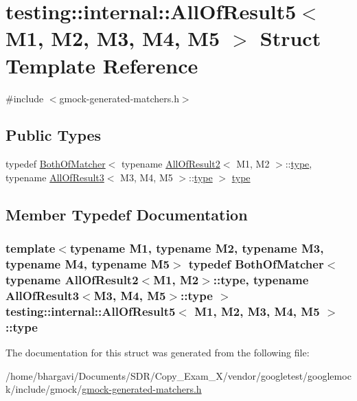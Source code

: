 \hypertarget{structtesting_1_1internal_1_1_all_of_result5}{}\section{testing\+:\+:internal\+:\+:All\+Of\+Result5$<$ M1, M2, M3, M4, M5 $>$ Struct Template Reference}
\label{structtesting_1_1internal_1_1_all_of_result5}


{\ttfamily \#include $<$gmock-\/generated-\/matchers.\+h$>$}

\subsection*{Public Types}
\begin{DoxyCompactItemize}
\item 
typedef \hyperlink{classtesting_1_1internal_1_1_both_of_matcher}{Both\+Of\+Matcher}$<$ typename \hyperlink{structtesting_1_1internal_1_1_all_of_result2}{All\+Of\+Result2}$<$ M1, M2 $>$\+::\hyperlink{structtesting_1_1internal_1_1_all_of_result5_aee2e1fb803f428741d147347b692d108}{type}, typename \hyperlink{structtesting_1_1internal_1_1_all_of_result3}{All\+Of\+Result3}$<$ M3, M4, M5 $>$\+::\hyperlink{structtesting_1_1internal_1_1_all_of_result5_aee2e1fb803f428741d147347b692d108}{type} $>$ \hyperlink{structtesting_1_1internal_1_1_all_of_result5_aee2e1fb803f428741d147347b692d108}{type}
\end{DoxyCompactItemize}


\subsection{Member Typedef Documentation}
\subsubsection[{\texorpdfstring{type}{type}}]{\setlength{\rightskip}{0pt plus 5cm}template$<$typename M1, typename M2, typename M3, typename M4, typename M5$>$ typedef {\bf Both\+Of\+Matcher}$<$ typename {\bf All\+Of\+Result2}$<$M1, M2$>$\+::{\bf type}, typename {\bf All\+Of\+Result3}$<$M3, M4, M5$>$\+::{\bf type} $>$ {\bf testing\+::internal\+::\+All\+Of\+Result5}$<$ M1, M2, M3, M4, M5 $>$\+::{\bf type}}\hypertarget{structtesting_1_1internal_1_1_all_of_result5_aee2e1fb803f428741d147347b692d108}{}\label{structtesting_1_1internal_1_1_all_of_result5_aee2e1fb803f428741d147347b692d108}


The documentation for this struct was generated from the following file\+:\begin{DoxyCompactItemize}
\item 
/home/bhargavi/\+Documents/\+S\+D\+R/\+Copy\+\_\+\+Exam\+\_\+X/vendor/googletest/googlemock/include/gmock/\hyperlink{gmock-generated-matchers_8h}{gmock-\/generated-\/matchers.\+h}\end{DoxyCompactItemize}
